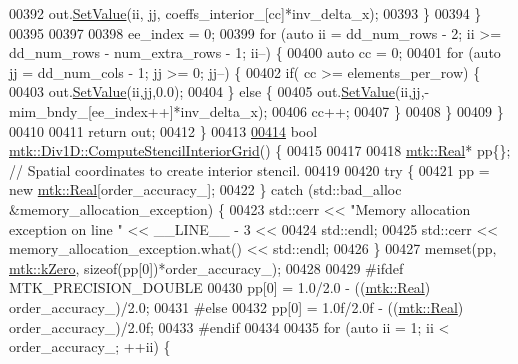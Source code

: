 \begin{DoxyCode}
{{00392       out.\hyperlink{classmtk_1_1DenseMatrix_a784ce5784109ac86bfb9d8562b334b13}{SetValue}(ii, jj, coeffs\_interior\_[cc]*inv\_delta\_x);
00393     \}
00394   \}
00395 
00397 
00398   ee\_index = 0;
00399   \textcolor{keywordflow}{for} (\textcolor{keyword}{auto} ii = dd\_num\_rows - 2; ii >= dd\_num\_rows - num\_extra\_rows - 1; ii--) \{
00400     \textcolor{keyword}{auto} cc = 0;
00401     \textcolor{keywordflow}{for} (\textcolor{keyword}{auto} jj = dd\_num\_cols - 1; jj >= 0; jj--) \{
00402       \textcolor{keywordflow}{if}( cc >= elements\_per\_row) \{
00403         out.\hyperlink{classmtk_1_1DenseMatrix_a784ce5784109ac86bfb9d8562b334b13}{SetValue}(ii,jj,0.0);
00404       \} \textcolor{keywordflow}{else} \{
00405         out.\hyperlink{classmtk_1_1DenseMatrix_a784ce5784109ac86bfb9d8562b334b13}{SetValue}(ii,jj,-mim\_bndy\_[ee\_index++]*inv\_delta\_x);
00406         cc++;
00407       \}
00408      \}
00409   \}
00410 
00411   \textcolor{keywordflow}{return} out;
00412 \}
00413 
\hypertarget{mtk__div__1d_8cc_source_l00414}{}\hyperlink{classmtk_1_1Div1D_a3eb3a32862a6b066cd583cbbd00a6509}{00414} \textcolor{keywordtype}{bool} \hyperlink{classmtk_1_1Div1D_a3eb3a32862a6b066cd583cbbd00a6509}{mtk::Div1D::ComputeStencilInteriorGrid}() \{
00415 
00417 
00418   \hyperlink{group__c01-roots_gac080bbbf5cbb5502c9f00405f894857d}{mtk::Real}* pp\{\}; \textcolor{comment}{// Spatial coordinates to create interior stencil.}
00419 
00420   \textcolor{keywordflow}{try} \{
00421     pp = \textcolor{keyword}{new} \hyperlink{group__c01-roots_gac080bbbf5cbb5502c9f00405f894857d}{mtk::Real}[order\_accuracy\_];
00422   \} \textcolor{keywordflow}{catch} (std::bad\_alloc &memory\_allocation\_exception) \{
00423     std::cerr << \textcolor{stringliteral}{"Memory allocation exception on line "} << \_\_LINE\_\_ - 3 <<
00424       std::endl;
00425     std::cerr << memory\_allocation\_exception.what() << std::endl;
00426   \}
00427   memset(pp, \hyperlink{group__c01-roots_ga59a451a5fae30d59649bcda274fea271}{mtk::kZero}, \textcolor{keyword}{sizeof}(pp[0])*order\_accuracy\_);
00428 
00429 \textcolor{preprocessor}{  #ifdef MTK\_PRECISION\_DOUBLE}
00430   pp[0] = 1.0/2.0 - ((\hyperlink{group__c01-roots_gac080bbbf5cbb5502c9f00405f894857d}{mtk::Real}) order\_accuracy\_)/2.0;
00431 \textcolor{preprocessor}{  #else}
00432   pp[0] = 1.0f/2.0f - ((\hyperlink{group__c01-roots_gac080bbbf5cbb5502c9f00405f894857d}{mtk::Real}) order\_accuracy\_)/2.0f;
00433 \textcolor{preprocessor}{  #endif}
00434 
00435   \textcolor{keywordflow}{for} (\textcolor{keyword}{auto} ii = 1; ii < order\_accuracy\_; ++ii) \{
}}
\end{DoxyCode}
